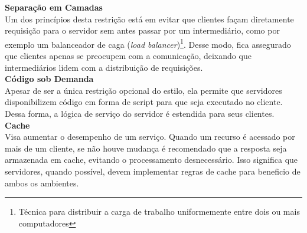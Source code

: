 \textbf{Separação em Camadas} \\

Um dos princípios desta restrição está em evitar que clientes façam diretamente requisição para o servidor sem antes passar por um intermediário, como por exemplo um balanceador de caga (\textit{load balancer})\footnote{
  Técnica para distribuir a carga de trabalho uniformemente entre dois ou mais computadores
}. Desse modo, fica assegurado que clientes apenas se preocupem com a comunicação, deixando que intermediários lidem com a distribuição de requisições. \cite{Fielding2000} \\

\textbf{Código sob Demanda} \\

Apesar de ser a única restrição opcional do estilo, ela permite que servidores disponibilizem código em forma de script para que seja executado no cliente. Dessa forma, a lógica de serviço do servidor é estendida para seus clientes. \cite{Fielding2000} \\

\textbf{Cache} \\

Visa aumentar o desempenho de um serviço. Quando um recurso é acessado por mais de um cliente, se não houve mudança é recomendado que a resposta seja armazenada em cache, evitando o processamento desnecessário. Isso significa que servidores, quando possível, devem implementar regras de cache para beneficio de ambos os ambientes. \cite{Fielding2000}

